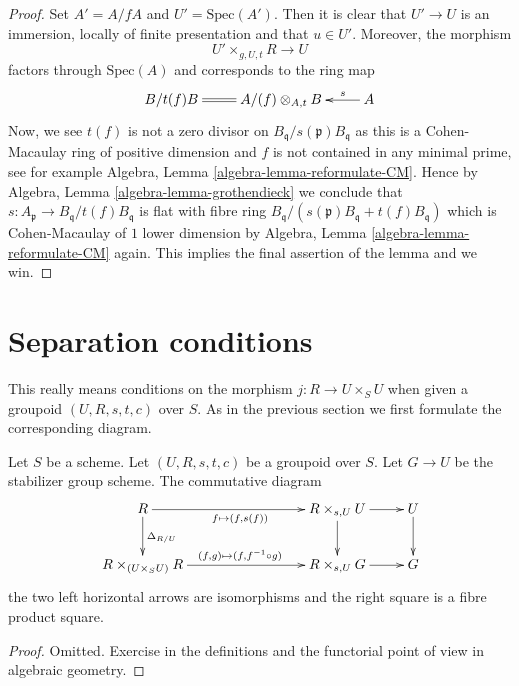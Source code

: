 \begin{proof}
\medskip\noindent
Set $A' = A/fA$ and $U' = \text{Spec}(A')$. Then it is clear that
$U' \to U$ is an immersion, locally of finite presentation
and that $u \in U'$. Moreover, the morphism
$$
U' \times_{g, U, t} R \longrightarrow U
$$
factors through $\text{Spec}(A)$ and corresponds to the ring map
$$
\xymatrix{
B/t(f)B \ar@{=}[r] & A/(f) \otimes_{A, t} B & A \ar[l]_-s
}
$$
Now, we see $t(f)$ is not a zero divisor on
$B_{\mathfrak q}/s(\mathfrak p)B_{\mathfrak q}$ as this is a
Cohen-Macaulay ring of positive dimension and $f$ is not contained
in any minimal prime, see for example
Algebra, Lemma \ref{algebra-lemma-reformulate-CM}.
Hence by
Algebra, Lemma \ref{algebra-lemma-grothendieck}
we conclude that $s : A_{\mathfrak p} \to B_{\mathfrak q}/t(f)B_{\mathfrak q}$
is flat with fibre ring
$B_{\mathfrak q}/(s(\mathfrak p)B_{\mathfrak q} + t(f)B_{\mathfrak q})$
which is Cohen-Macaulay of $1$ lower dimension by
Algebra, Lemma \ref{algebra-lemma-reformulate-CM}
again. This implies the final assertion of the lemma and we win.
\end{proof}









\section{Separation conditions}
\label{section-separation}

\noindent
This really means conditions on the morphism $j : R \to U \times_S U$
when given a groupoid $(U, R, s, t, c)$ over $S$. As in the previous
section we first formulate the corresponding diagram.

\begin{lemma}
\label{lemma-diagram-diagonal}
Let $S$ be a scheme.
Let $(U, R, s, t, c)$ be a groupoid over $S$.
Let $G \to U$ be the stabilizer group scheme.
The commutative diagram
$$
\xymatrix{
R \ar[d]^{\Delta_{R/U}} \ar[rrr]_{f \mapsto (f, s(f))} & & &
R \times_{s, U} U \ar[d] \ar[r] & U \ar[d] \\
R \times_{(U \times_S U)} R \ar[rrr]^{(f, g) \mapsto (f, f^{-1} \circ g)} & & &
R \times_{s, U} G \ar[r] & G
}
$$
the two left horizontal arrows are isomorphisms
and the right square is a fibre product square.
\end{lemma}

\begin{proof}
Omitted.
Exercise in the definitions and the functorial point of
view in algebraic geometry.
\end{proof}

